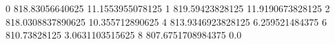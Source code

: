 0 818.83056640625 11.1553955078125
1 819.59423828125 11.9190673828125
2 818.0308837890625 10.355712890625
4 813.9346923828125 6.259521484375
6 810.73828125 3.0631103515625
8 807.6751708984375 0.0
